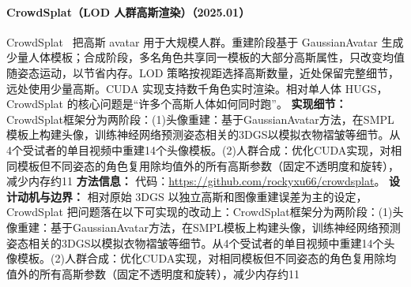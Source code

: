 \paragraph{CrowdSplat（LOD 人群高斯渲染）（2025.01）}
CrowdSplat~\cite{2501_17792} 把高斯 avatar 用于大规模人群。重建阶段基于 GaussianAvatar 生成少量人体模板；合成阶段，多名角色共享同一模板的大部分高斯属性，只改变均值随姿态运动，以节省内存。LOD 策略按视距选择高斯数量，近处保留完整细节，远处使用少量高斯。CUDA 实现支持数千角色实时渲染。相对单人体 HUGS，CrowdSplat 的核心问题是“许多个高斯人体如何同时跑”。
\textbf{实现细节：} CrowdSplat框架分为两阶段：(1)头像重建：基于GaussianAvatar方法，在SMPL模板上构建头像，训练神经网络预测姿态相关的3DGS以模拟衣物褶皱等细节。从4个受试者的单目视频中重建14个头像模板。(2)人群合成：优化CUDA实现，对相同模板但不同姿态的角色复用除均值外的所有高斯参数（固定不透明度和旋转），减少内存约11
\textbf{方法信息：} 代码：\url{https://github.com/rockyxu66/crowdsplat}。
\textbf{设计动机与边界：} 相对原始 3DGS 以独立高斯和图像重建误差为主的设定，CrowdSplat 把问题落在以下可实现的改动上：CrowdSplat框架分为两阶段：(1)头像重建：基于GaussianAvatar方法，在SMPL模板上构建头像，训练神经网络预测姿态相关的3DGS以模拟衣物褶皱等细节。从4个受试者的单目视频中重建14个头像模板。(2)人群合成：优化CUDA实现，对相同模板但不同姿态的角色复用除均值外的所有高斯参数（固定不透明度和旋转），减少内存约11%

